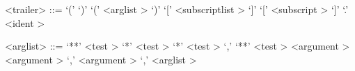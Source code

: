 \begin{grammar}
<trailer> ::= `(' `)'
	\alt `(' <arglist \myref[arglistb]> `)'
	\alt `[' <subscriptlist \myref[subscriptlistb]> `]'
	\alt `[' <subscript \myref[subscriptb]> `]'
	\alt `.' <ident \myref[identb]>
\end{grammar}


\label{arglistb}

\begin{grammar}
<arglist> ::= `**' <test \myref[testb]>
	\alt `*' <test \myref[testb]>
	\alt `*' <test \myref[testb]> `,' `**' <test \myref[testb]>
	\alt <argument \myref[argumentb]>
	\alt <argument \myref[argumentb]> `,'
	\alt <argument \myref[argumentb]> `,' <arglist \myref[arglistb]>
\end{grammar}


\label{argumentb}

